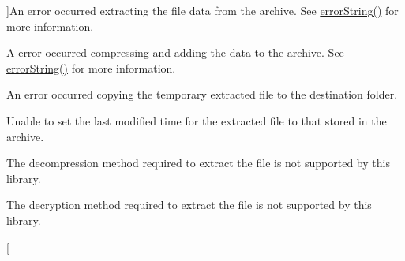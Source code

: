 \begin{Desc}
\begin{description}
{}]An error occurred extracting the file data from the archive. See \hyperlink{class_ab_zip_a218ae44456c9e7518ad22fb9f8fd7466}{error\+String()} for more information. \item[{\em 
Add\+File\+Failed\hypertarget{class_ab_zip_ac669c2fce0fbde75677d12711c11c504a75a9dbed21bb60a9b71c8334ad48fe01}{}\label{class_ab_zip_ac669c2fce0fbde75677d12711c11c504a75a9dbed21bb60a9b71c8334ad48fe01}
}]A error occurred compressing and adding the data to the archive. See \hyperlink{class_ab_zip_a218ae44456c9e7518ad22fb9f8fd7466}{error\+String()} for more information. \item[{\em 
Copy\+Error\hypertarget{class_ab_zip_ac669c2fce0fbde75677d12711c11c504af1834b62bfacbc694454951991db07d8}{}\label{class_ab_zip_ac669c2fce0fbde75677d12711c11c504af1834b62bfacbc694454951991db07d8}
}]An error occurred copying the temporary extracted file to the destination folder. \item[{\em 
Set\+Mod\+Time\+Failed\hypertarget{class_ab_zip_ac669c2fce0fbde75677d12711c11c504a193afd741eb566f39b60449b5382cbd1}{}\label{class_ab_zip_ac669c2fce0fbde75677d12711c11c504a193afd741eb566f39b60449b5382cbd1}
}]Unable to set the last modified time for the extracted file to that stored in the archive. \item[{\em 
Invalid\+Compressor\hypertarget{class_ab_zip_ac669c2fce0fbde75677d12711c11c504aef61d198809fa602715c8417ce4b7eb8}{}\label{class_ab_zip_ac669c2fce0fbde75677d12711c11c504aef61d198809fa602715c8417ce4b7eb8}
}]The decompression method required to extract the file is not supported by this library. \item[{\em 
Invalid\+Encryption\hypertarget{class_ab_zip_ac669c2fce0fbde75677d12711c11c504a34988dd81ed571efcab3f7143a94b485}{}\label{class_ab_zip_ac669c2fce0fbde75677d12711c11c504a34988dd81ed571efcab3f7143a94b485}
}]The decryption method required to extract the file is not supported by this library. \item[{\em 
}
\end{description}
\end{Desc}
